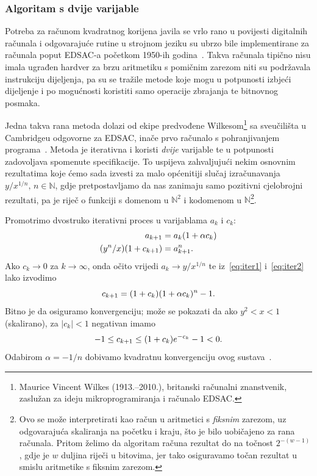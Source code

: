 \documentclass[12pt]{scrartcl}
\begin{document}
\subsubsection{Algoritam s dvije varijable}
Potreba za računom kvadratnog korijena javila se vrlo rano u povijesti digitalnih računala i odgovarajuće rutine u strojnom jeziku
su ubrzo bile implementirane za računala poput EDSAC-a početkom 1950-ih godina~\cite{gower}. Takva računala tipično nisu imala ugrađen
hardver za brzu aritmetiku s pomičnim zarezom niti su podržavala instrukciju dijeljenja, pa su se tražile metode koje mogu u potpunosti
izbjeći dijeljenje i po mogućnosti koristiti samo operacije zbrajanja te bitnovnog posmaka.

Jedna takva rana metoda dolazi od ekipe predvođene Wilkesom\footnote{Maurice
Vincent Wilkes (1913.--2010.), britanski računalni znanstvenik, zaslužan za ideju mikroprogramiranja i računalo EDSAC.}
sa sveučilišta u Cambridgeu odgovorne za EDSAC,
inače prvo računalo s pohranjivanjem programa~\cite[str.~32]{ribaric}. Metoda je iterativna i koristi \emph{dvije} varijable te 
u potpunosti zadovoljava spomenute specifikacije. To uspijeva zahvaljujući nekim osnovnim rezultatima koje ćemo sada izvesti za
malo općenitiji slučaj izračunavanja $y/x^{1/n},\,n\in\mathbb{N}$, gdje pretpostavljamo da nas zanimaju samo pozitivni cjelobrojni rezultati, pa
je riječ o funkciji s domenom u $\mathbb{N}^2$ i kodomenom u $\mathbb N$\footnote{Ovo se može interpretirati kao račun u aritmetici
s \emph{fiksnim} zarezom, uz odgovarajuća skaliranja na početku i kraju, što je bilo uobičajeno za rana računala. Pritom želimo da algoritam
računa rezultat do na točnost $2^{-(w-1)}$, gdje je $w$ duljina riječi u bitovima, jer tako osiguravamo točan rezultat u smislu aritmetike
s fiksnim zarezom.}.

Promotrimo dvostruko iterativni proces u varijablama $a_k$ i $c_k$:
\begin{align}
        a_{k+1} &= a_k(1 + \alpha c_k)\label{eq:iter1}\\
        (y^n / x)(1 + c_{k+1}) &= a^n_{k+1}\label{eq:iter2}\text.
\end{align}
Ako $c_k\to 0$ za $k\to\infty$, onda očito vrijedi $a_k\to y/x^{1/n}$ te iz~\eqref{eq:iter1} i~\eqref{eq:iter2} lako izvodimo
\begin{equation}
    c_{k+1} = (1+c_k)(1+\alpha c_k)^n - 1\text.
\end{equation}
Bitno je da osiguramo konvergenciju; može se pokazati da ako $y^2<x<1$ (skalirano), za $|c_k|<1$ negativan imamo
\begin{equation}\label{eq:edsacscale}
    -1\leq c_{k+1}\leq(1+c_k)e^{-c_k}-1<0\text.
\end{equation}
Odabirom $\alpha=-1/n$ dobivamo kvadratnu konvergenciju ovog sustava~\cite{gower}.
\end{document}
